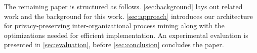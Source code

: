 The remaining paper is structured as follows. \autoref{sec:background} lays out 
related work and the background for this work. \autoref{sec:approach} 
introduces our architecture for privacy-preserving inter-organizational process 
mining along with the optimizations needed for efficient implementation. An 
experimental evaluation is presented in \autoref{sec:evaluation}, before 
\autoref{sec:conclusion} concludes the paper. 

